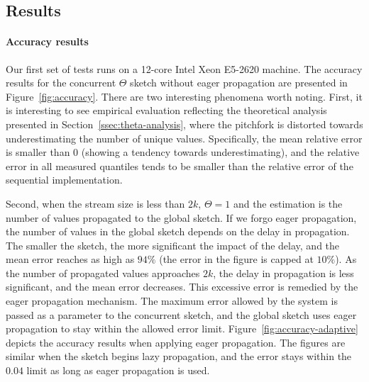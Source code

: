 \subsection{Results}
\label{ssec:results}

\paragraph{Accuracy results}
Our first set of tests runs on a 12-core Intel Xeon E5-2620 machine. The accuracy results for the concurrent $\Theta$ sketch
without eager propagation are presented in Figure~\ref{fig:accuracy}. There are two interesting phenomena worth noting.
First, it is interesting to see empirical evaluation reflecting the theoretical analysis presented in Section~\ref{ssec:theta-analysis},
where the pitchfork is distorted towards underestimating the number of unique values. Specifically, the mean relative error is smaller
than $0$ (showing a tendency towards underestimating), and the relative error in all measured quantiles tends to be smaller
than the relative error of the sequential implementation.

Second, when the stream size is less than $2k$, $\Theta=1$ and the estimation is the number of values propagated to the
global sketch. If we forgo eager propagation, the number of values in the global sketch depends on the delay in propagation. The
smaller the sketch, the more significant the impact of the delay, and the mean error reaches as high as $94\%$ (the error in
the figure is capped at $10\%$). As the number of propagated values approaches $2k$, the delay in propagation is less significant, and
the mean error decreases. This excessive error is remedied by the eager propagation mechanism. The maximum error allowed by
the system is passed as a parameter to the concurrent sketch, and the global sketch uses eager propagation to stay within
the allowed error limit. Figure~\ref{fig:accuracy-adaptive} depicts the accuracy results when applying eager
propagation. The figures are similar when the sketch begins lazy propagation, and the error stays within the $0.04$
limit as long as eager propagation is used.

